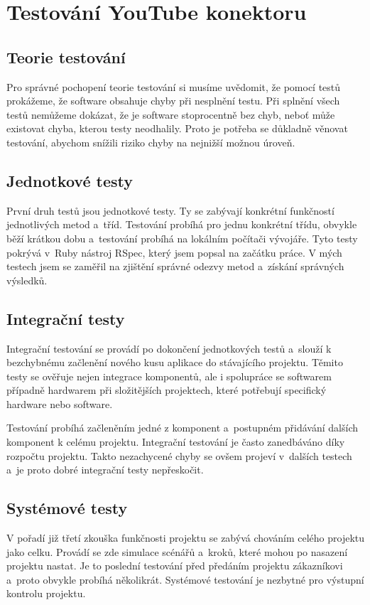\section{Testování YouTube konektoru}
\subsection{Teorie testování}
\par Pro správné pochopení teorie testování\cite{si1} si musíme uvědomit, že pomocí testů prokážeme, že software obsahuje chyby při nesplnění testu. Při splnění všech testů nemůžeme dokázat, že je software stoprocentně bez chyb, neboť může existovat chyba, kterou testy neodhalily. Proto je potřeba se důkladně věnovat testování, abychom snížili riziko chyby na nejnižší možnou úroveň.
\subsection{Jednotkové testy}
\par První druh testů jsou jednotkové testy\cite{si1}. Ty se zabývají konkrétní funkčností jednotlivých metod a~tříd. Testování probíhá pro jednu konkrétní třídu, obvykle běží krátkou dobu a~testování probíhá na lokálním počítači vývojáře. Tyto testy pokrývá v~Ruby nástroj RSpec, který jsem popsal na začátku práce. V mých testech jsem se zaměřil na zjištění správné odezvy metod a~získání správných výsledků.
\subsection{Integrační testy}
\par Integrační testování\cite{si1} se provádí po dokončení jednotkových testů a~slouží k bezchybnému začlenění nového kusu aplikace do stávajícího projektu. Těmito testy se ověřuje nejen integrace komponentů, ale i spolupráce se softwarem případně hardwarem při složitějších projektech, které potřebují specifický hardware nebo software. 
\par Testování probíhá začleněním jedné z komponent a~postupném přidávání dalších komponent k celému projektu. Integrační testování je často zanedbáváno díky rozpočtu projektu. Takto nezachycené chyby se ovšem projeví v~dalších testech a~je proto dobré integrační testy nepřeskočit.
\subsection{Systémové testy}
\par V pořadí již třetí zkouška funkčnosti projektu se zabývá chováním celého projektu jako celku. Provádí se zde simulace scénářů a~kroků, které mohou po nasazení projektu nastat. Je to poslední testování před předáním projektu zákazníkovi a~proto obvykle probíhá několikrát. Systémové testování\cite{si1} je nezbytné pro výstupní kontrolu projektu.
